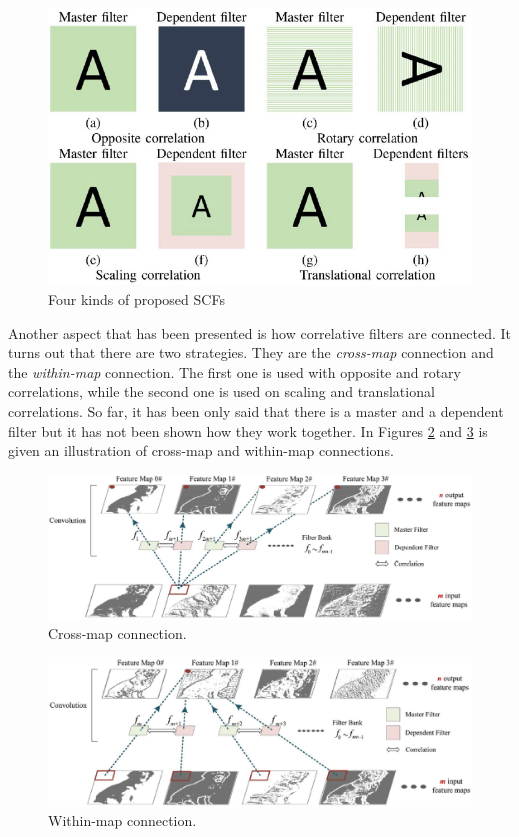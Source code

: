 \begin{figure}[h!]
    \centering
    \includegraphics[scale=0.60]{images/02_1.png}
    \caption{Four kinds of proposed SCFs}
    \label{fig:02_1}
\end{figure}

\FloatBarrier

Another aspect that has been presented is how correlative filters are connected. It turns out that there are two strategies. They are the \textit{cross-map} connection and the \textit{within-map} connection. The first one is used with opposite and rotary correlations, while the second one is used on scaling and translational correlations. So far, it has been only said that there is a master and a dependent filter but it has not been shown how they work together. In Figures \ref{fig:02_2} and \ref{fig:02_3} is given an illustration of cross-map and within-map connections.

\begin{figure}[h!]
    \centering
    \includegraphics[scale=0.50]{images/02_2.png}
    \caption{Cross-map connection.}
    \label{fig:02_2}
\end{figure}

\FloatBarrier

\begin{figure}[h!]
    \centering
    \includegraphics[scale=0.50]{images/02_3.png}
    \caption{Within-map connection.}
    \label{fig:02_3}
\end{figure}

